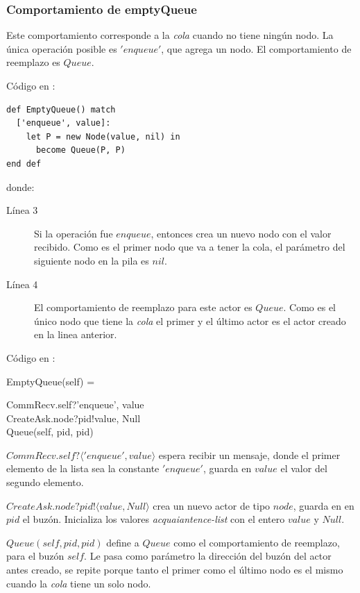 \subsubsection*{Comportamiento de emptyQueue}
Este comportamiento corresponde a la \textit{cola} cuando no tiene ningún nodo. La única operación posible es $'enqueue'$, que agrega un nodo. El comportamiento de reemplazo es $Queue$.

Código en \SAL:

\begin{lstlisting}[language=sal, style=simple]
def EmptyQueue() match
  ['enqueue', value]:
    let P = new Node(value, nil) in
      become Queue(P, P)
end def
\end{lstlisting}
donde:
\begin{description}
 \item [Línea 3] Si la operación fue $enqueue$, entonces crea un nuevo nodo con el valor recibido. Como es el primer nodo que va a tener la cola, el parámetro del siguiente nodo en la pila es $nil$.
 \item [Línea 4] El comportamiento de reemplazo para este actor es $Queue$. Como es el único nodo que tiene la \textit{cola} el primer y el último actor es el actor creado en la linea anterior.
\end{description}

Código en \CSP:

\begin{process}
EmptyQueue(self) = \\ \quad
  \begin{block}
  CommRecv.self?\langle 'enqueue', value \rangle \then \\ 
  CreateAsk.node?pid!\langle value, Null\rangle \then \\
  Queue(self, pid, pid)
  \end{block}
\end{process}

\begin{description}
 \item $CommRecv.self?\langle 'enqueue', value \rangle$ espera recibir un mensaje, donde el primer elemento de la lista sea la constante $'enqueue'$, guarda en $value$ el valor del segundo elemento.
 \item $CreateAsk.node?pid!\langle value, Null \rangle$ crea un nuevo actor de tipo $node$, guarda en en $pid$ el buzón. Inicializa los valores \textit{acquaiantence-list} con el entero $value$ y $Null$.
 \item $Queue(self, pid, pid)$ define a $Queue$ como el comportamiento de reemplazo, para el buzón $self$. Le pasa como parámetro la dirección del buzón del actor antes creado, se repite porque tanto el primer como el último nodo es el mismo cuando la \textit{cola} tiene un solo nodo.
\end{description}

